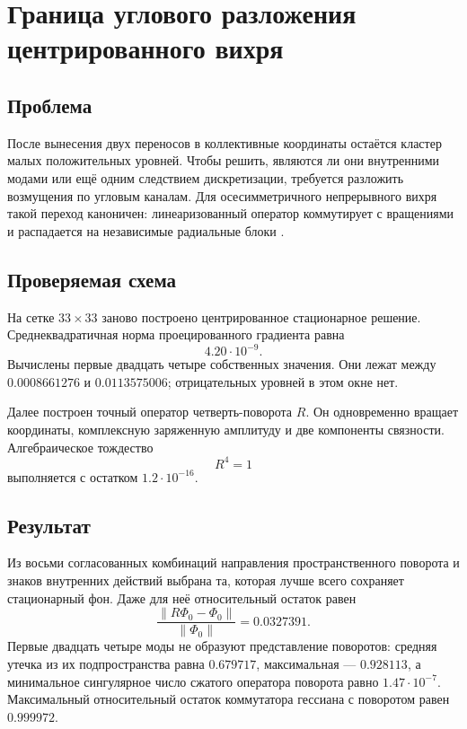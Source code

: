 \chapter{Граница углового разложения центрированного вихря}
\label{ch:v6-bosonic-defect-centered-angular-channel-decomposition-gate}

\section{Проблема}

После вынесения двух переносов в коллективные координаты остаётся кластер
малых положительных уровней. Чтобы решить, являются ли они внутренними модами
или ещё одним следствием дискретизации, требуется разложить возмущения по
угловым каналам. Для осесимметричного непрерывного вихря такой переход
каноничен: линеаризованный оператор коммутирует с вращениями и распадается на
независимые радиальные блоки \cite{alonso-vortex-spectrum,
ginzburg-landau-morse-index}.

\section{Проверяемая схема}

На сетке $33\times33$ заново построено центрированное стационарное решение.
Среднеквадратичная норма проецированного градиента равна
\[
  4.20\cdot10^{-9}.
\]
Вычислены первые двадцать четыре собственных значения. Они лежат между
$0.0008661276$ и $0.0113575006$; отрицательных уровней в этом окне нет.

Далее построен точный оператор четверть-поворота $R$. Он одновременно
вращает координаты, комплексную заряженную амплитуду и две компоненты
связности. Алгебраическое тождество
\[
  R^4=1
\]
выполняется с остатком $1.2\cdot10^{-16}$.

\section{Результат}

Из восьми согласованных комбинаций направления пространственного поворота и
знаков внутренних действий выбрана та, которая лучше всего сохраняет
стационарный фон. Даже для неё относительный остаток равен
\[
  \frac{\|R\Phi_0-\Phi_0\|}{\|\Phi_0\|}=0.0327391.
\]
Первые двадцать четыре моды не образуют представление поворотов:
средняя утечка из их подпространства равна $0.679717$, максимальная ---
$0.928113$, а минимальное сингулярное число сжатого оператора поворота равно
$1.47\cdot10^{-7}$. Максимальный относительный остаток коммутатора гессиана с
поворотом равен $0.999972$.

